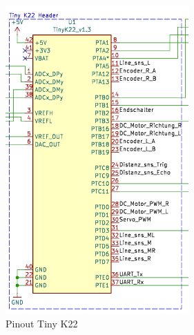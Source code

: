 \begin{figure}[H]
\centering
\begin{minipage}[b]{0.45\textwidth}
  \centering
  \includegraphics[width=\textwidth]{assets/ET/Software/Tiny_Pinout.png}
  \caption{Pinout Tiny K22}
  \label{fig:Pinout TinyK22}
\end{minipage}
\hspace{0.05\textwidth} %
\begin{minipage}[b]{0.45\textwidth}
  \centering

\end{minipage}
\end{figure}
